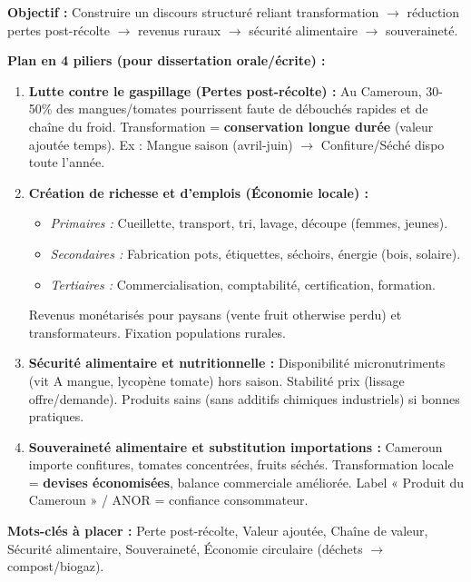 \documentclass[11pt]{article}
\newcommand{\cle}[1]{{\popxbold\color{popdark}#1}}
\begin{document}
\begin{methode}
\textbf{Objectif :} Construire un discours structuré reliant transformation $\rightarrow$ réduction pertes post-récolte $\rightarrow$ revenus ruraux $\rightarrow$ sécurité alimentaire $\rightarrow$ souveraineté.\par
\textbf{Plan en 4 piliers (pour dissertation orale/écrite) :}
\begin{enumerate}
    \item \textbf{Lutte contre le gaspillage (Pertes post-récolte) :} Au Cameroun, 30-50\% des mangues/tomates pourrissent faute de débouchés rapides et de chaîne du froid. Transformation = \textbf{conservation longue durée} (valeur ajoutée temps). Ex : Mangue saison (avril-juin) $\rightarrow$ Confiture/Séché dispo toute l'année.
    \item \textbf{Création de richesse et d'emplois (Économie locale) :}
    \begin{itemize}
        \item \textit{Primaires :} Cueillette, transport, tri, lavage, découpe (femmes, jeunes).
        \item \textit{Secondaires :} Fabrication pots, étiquettes, séchoirs, énergie (bois, solaire).
        \item \textit{Tertiaires :} Commercialisation, comptabilité, certification, formation.
    \end{itemize}
    Revenus monétarisés pour paysans (vente fruit otherwise perdu) et transformateurs. Fixation populations rurales.
    \item \textbf{Sécurité alimentaire et nutritionnelle :} Disponibilité micronutriments (vit A mangue, lycopène tomate) hors saison. Stabilité prix (lissage offre/demande). Produits sains (sans additifs chimiques industriels) si bonnes pratiques.
    \item \textbf{Souveraineté alimentaire et substitution importations :} Cameroun importe confitures, tomates concentrées, fruits séchés. Transformation locale = \textbf{devises économisées}, balance commerciale améliorée. Label « Produit du Cameroun » / ANOR = confiance consommateur.
\end{enumerate}
\textbf{Mots-clés à placer :} \cle{Perte post-récolte}, \cle{Valeur ajoutée}, \cle{Chaîne de valeur}, \cle{Sécurité alimentaire}, \cle{Souveraineté}, \cle{Économie circulaire} (déchets $\rightarrow$ compost/biogaz).
\end{methode}
\end{document}
